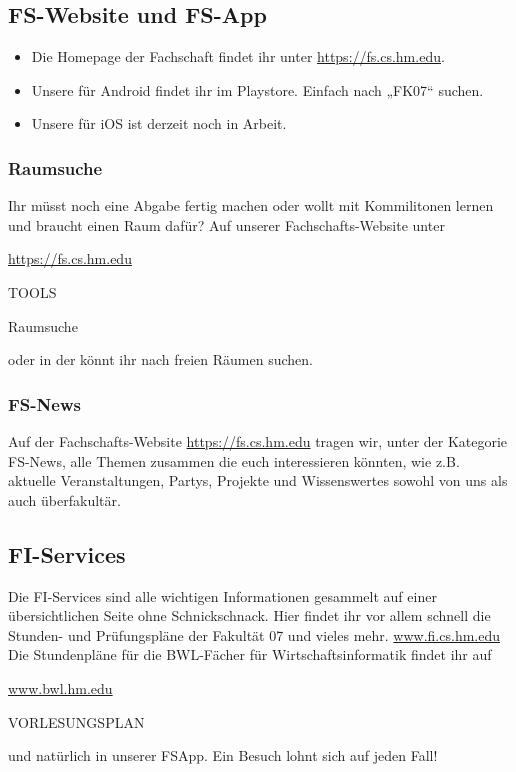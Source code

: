 \subsection{FS-Website und FS-App}
\begin{itemize}
	\item Die Homepage der Fachschaft findet ihr unter \url{https://fs.cs.hm.edu}.
	\item Unsere  für Android findet ihr im Playstore. 
	Einfach nach „FK07“ suchen.
	\item Unsere  für iOS ist derzeit noch in Arbeit.
\end{itemize}

\subsubsection{Raumsuche}
Ihr müsst noch eine Abgabe fertig machen oder wollt mit Kommilitonen 
lernen und braucht einen Raum dafür? Auf unserer Fachschafts-Website unter
\begin{sitenav}
	\item \url{https://fs.cs.hm.edu}
	\item TOOLS
	\item Raumsuche
\end{sitenav} oder in der
 könnt ihr nach freien Räumen suchen.

\subsubsection{FS-News}
Auf der Fachschafts-Website \url{https://fs.cs.hm.edu} tragen wir, unter der Kategorie FS-News, alle Themen zusammen die euch interessieren könnten, wie z.B. 
aktuelle Veranstaltungen, Partys, Projekte und Wissenswertes sowohl 
von uns als auch überfakultär. 

\subsection{FI-Services}
Die FI-Services sind alle wichtigen Informationen gesammelt auf einer 
übersichtlichen Seite ohne Schnickschnack. Hier findet ihr vor allem 
schnell die Stunden- und Prüfungspläne der Fakultät 07 und vieles mehr.
\url{www.fi.cs.hm.edu}\doublebreak
Die Stundenpläne für die BWL-Fächer für Wirtschaftsinformatik 
findet ihr auf 
\begin{sitenav}
	\item \url{www.bwl.hm.edu}
	\item VORLESUNGSPLAN
\end{sitenav}
und natürlich in unserer FSApp.
Ein Besuch lohnt sich auf jeden Fall!

